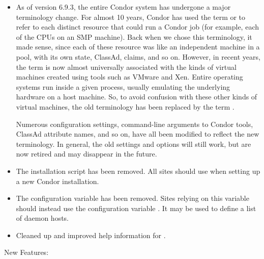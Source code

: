 \begin{itemize}

\item As of version 6.9.3, the entire Condor system has undergone a
  major terminology change.
  For almost 10 years, Condor has used the term 
  or  to refer to each distinct resource that could run a
  Condor job (for example, each of the CPUs on an SMP machine).
  Back when we chose this terminology, it made sense, since each of
  these resource was like an independent machine in a pool, with
  its own state, ClassAd, claims, and so on.
  However, in recent years, the term  is now
  almost universally associated with the kinds of virtual machines
  created using tools such as VMware and Xen.  Entire operating systems
  run inside a given process, usually emulating the underlying
  hardware on a host machine.
  So, to avoid confusion with these other kinds of virtual machines,
  the old   terminology has been replaced by
  the term .

  Numerous configuration settings, command-line arguments to Condor
  tools, ClassAd attribute names, and so on, have all been
  modified to reflect the new  terminology.
  In general, the old settings and options will still work, but are
  now retired and may disappear in the future.

\item The  installation script has
  been removed.
  All sites should use  when setting up a new Condor
  installation.

\item The  configuration variable has
  been removed.
  Sites relying on this variable should instead use the configuration
  variable . It may be used to
  define a list of  daemon hosts.

\item Cleaned up and improved help information for .

\end{itemize}


\noindent New Features:


